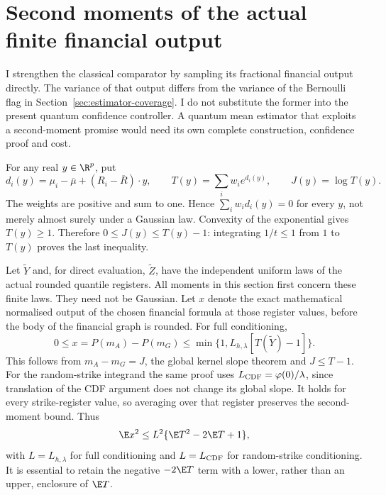\section{Second moments of the actual finite financial output}
\label{sec:finite-second-moment}

I strengthen the classical comparator by sampling its fractional financial
output directly. The variance of that output differs from the variance of
the Bernoulli flag in Section~\ref{sec:estimator-coverage}. I do not substitute
the former into the present quantum confidence controller. A quantum mean
estimator that exploits a second-moment promise would need its own complete
construction, confidence proof and cost.

For any real $y\in\R^p$, put
\begin{equation}
 d_i(y)=\mu_i-\overline\mu+(R_i-\overline R)\cdot y,
 \qquad T(y)=\sum_iw_i e^{d_i(y)},\qquad J(y)=\log T(y).
\end{equation}
The weights are positive and sum to one. Hence
$\sum_iw_i d_i(y)=0$ for every $y$, not merely almost surely under a
Gaussian law. Convexity of the exponential gives $T(y)\geq1$. Therefore
$0\leq J(y)\leq T(y)-1$: integrating $1/t\leq1$ from $1$ to $T(y)$
proves the last inequality.

Let $\widetilde Y$ and, for direct evaluation, $\widetilde Z$, have the
independent uniform laws of the actual rounded quantile registers. All
moments in this section first concern these finite laws. They need not
be Gaussian. Let $x$ denote the exact mathematical normalised output of
the chosen financial formula at those register values, before the body
of the financial graph is rounded. For full conditioning,
\begin{equation}\label{eq:second-full}
 0\leq x=P(m_A)-P(m_G)\leq
 \min\{1,L_{h,\lambda}[T(\widetilde Y)-1]\}.
\end{equation}
This follows from $m_A-m_G=J$, the global kernel slope theorem and
$J\leq T-1$. For the random-strike integrand the same proof uses
$L_{\rm CDF}=\varphi(0)/\lambda$, since translation of the CDF argument
does not change its global slope. It holds for every strike-register
value, so averaging over that register preserves the second-moment bound.
Thus
\begin{equation}\label{eq:second-gap}
 \E x^2\leq L^2\{\E T^2-2\E T+1\},
\end{equation}
with $L=L_{h,\lambda}$ for full conditioning and $L=L_{\rm CDF}$ for
random-strike conditioning. It is essential to retain the negative
$-2\E T$ term with a lower, rather than an upper, enclosure of $\E T$.

